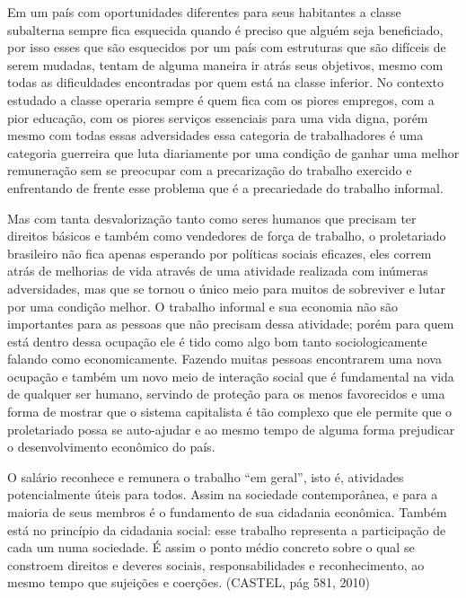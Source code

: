 Em um país com oportunidades diferentes para seus habitantes a classe subalterna sempre fica esquecida quando é preciso que alguém seja beneficiado, por isso esses que são esquecidos por um país com estruturas que são difíceis de serem mudadas, tentam de alguma maneira ir atrás seus objetivos, mesmo com todas as dificuldades encontradas por quem está na classe inferior.
No contexto estudado a classe operaria sempre é quem fica com os piores empregos, com a pior educação, com os piores serviços essenciais para uma vida digna, porém mesmo com todas essas adversidades essa categoria de trabalhadores é uma categoria guerreira que luta diariamente por uma condição de ganhar uma melhor remuneração sem se preocupar com a precarização do trabalho exercido e enfrentando de frente esse problema que é a precariedade do trabalho informal.

Mas com tanta desvalorização tanto como seres humanos que precisam ter direitos básicos e também como vendedores de força de trabalho, o proletariado brasileiro não fica apenas esperando por políticas sociais eficazes, eles correm atrás de melhorias de vida através de uma atividade realizada com inúmeras adversidades, mas que se tornou o único meio para muitos de sobreviver e lutar por uma condição melhor.
O trabalho informal e sua economia não são importantes para as pessoas que não precisam dessa atividade; porém para quem está dentro dessa ocupação ele é tido como algo bom tanto sociologicamente falando como economicamente. Fazendo muitas pessoas encontrarem uma nova ocupação e também um novo meio de interação social que é fundamental na vida de qualquer ser humano, servindo de proteção para os menos favorecidos e uma forma de mostrar que o sistema capitalista é tão complexo que ele permite que o proletariado possa se auto-ajudar e ao mesmo tempo de alguma forma prejudicar o desenvolvimento econômico do país.

\begin{citacao}
O salário reconhece e remunera o trabalho ``em geral'', isto é, atividades potencialmente úteis para todos. Assim na sociedade contemporânea, e para a maioria de seus membros é o fundamento de sua cidadania econômica. Também está no princípio da cidadania social: esse trabalho representa a participação de cada um numa sociedade. É assim o ponto médio concreto sobre o qual se constroem direitos e deveres sociais, responsabilidades e reconhecimento, ao mesmo tempo que sujeições e coerções. (CASTEL, pág 581, 2010)
\end{citacao}

